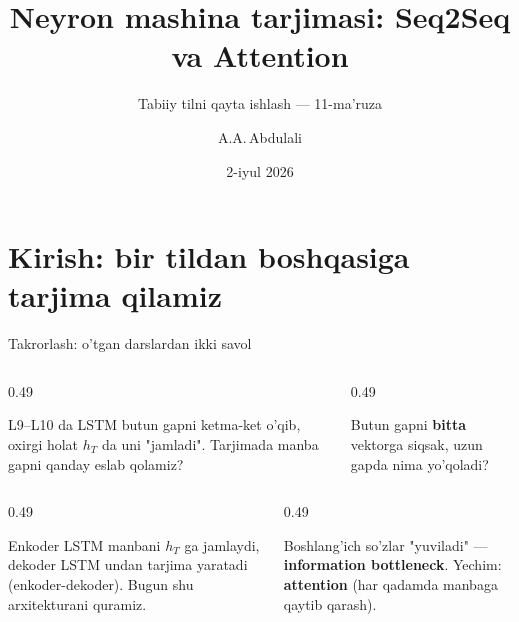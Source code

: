 \documentclass[aspectratio=169,11pt]{beamer}
\title[Seq2Seq va Attention]{Neyron mashina tarjimasi: Seq2Seq va Attention}
\subtitle{Tabiiy tilni qayta ishlash --- 11-ma'ruza}
\author[A.A.\,Abdulali]{A.A.\,Abdulali}
\date{2-iyul 2026}
\institute{11:00--12:20 \quad$\cdot$\quad mavzu \textnumero{}11}
\begin{document}

\maketitle

\section[Kirish]{Kirish: bir tildan boshqasiga tarjima qilamiz}

\begin{frame}{Takrorlash: o'tgan darslardan ikki savol}
  \begin{columns}[T]
    \begin{column}{0.49\textwidth}
      \begin{tcolorbox}[warnbox,title=1-savol]
        \small
        L9--L10 da LSTM butun gapni ketma-ket o'qib, oxirgi holat $h_T$ da uni
        "jamladi". Tarjimada manba gapni qanday eslab qolamiz?
      \end{tcolorbox}
    \end{column}
    \begin{column}{0.49\textwidth}
      \begin{tcolorbox}[warnbox,title=2-savol]
        \small
        Butun gapni \textbf{bitta} vektorga siqsak, uzun gapda nima yo'qoladi?
      \end{tcolorbox}
    \end{column}
  \end{columns}
  \pause
  \vspace{4pt}
  \begin{columns}[T]
    \begin{column}{0.49\textwidth}
      \begin{tcolorbox}[okbox,title=1-javob]
        \small
        Enkoder LSTM manbani $h_T$ ga jamlaydi, dekoder LSTM undan tarjima yaratadi
        (enkoder-dekoder). Bugun shu arxitekturani quramiz.
      \end{tcolorbox}
    \end{column}
    \begin{column}{0.49\textwidth}
      \begin{tcolorbox}[okbox,title=2-javob]
        \small
        Boshlang'ich so'zlar "yuviladi" --- \textbf{information bottleneck}. Yechim:
        \textbf{attention} (har qadamda manbaga qaytib qarash).
      \end{tcolorbox}
    \end{column}
  \end{columns}
\end{frame}
\end{document}
